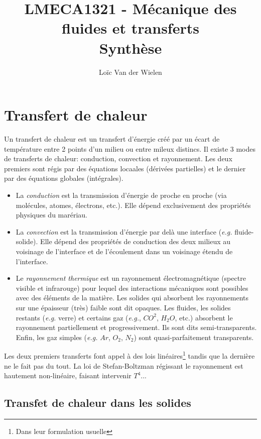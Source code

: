 \documentclass[a4paper,11pt]{report}
\title{LMECA1321 - Mécanique des fluides et transferts\\Synthèse}
\author{Loïc Van der Wielen}
\begin{document}
\maketitle
\tableofcontents




\chapter{Transfert de chaleur}
  Un transfert de chaleur est un transfert d'énergie créé par un écart de température entre 2 points d'un milieu ou entre mileux distincs. Il existe 3 modes de transferts de chaleur: conduction, convection et rayonnement. Les deux premiers sont régis par des équations locaales (dérivées partielles) et le dernier par des équations globales (intégrales).
  \begin{itemize}
    \item La \textit{conduction} est la transmission d'énergie de proche en proche (via molécules, atomes, électrons, etc.). Elle dépend exclusivement des propriétés physiques du marériau.
    \item La \textit{convection} est la transmission d'énergie par delà une interface (\textit{e.g.} fluide-solide). Elle dépend des propriétés de conduction des deux milieux au voisinage de l'interface et de l'écoulement dans un voisinage étendu de l'interface.
    \item Le \textit{rayonnement thermique} est un rayonnement électromagnétique (spectre visible et infrarouge) pour lequel des interactions mécaniques sont possibles avec des éléments de la matière. Les solides qui absorbent les rayonnements sur une épaisseur (très) faible sont dit opaques. Les fluides, les solides restants (\textit{e.g.} verre) et certains gaz (\textit{e.g.}, $CO^2$, $H_2O$, etc.) absorbent le rayonnement partiellement et progressivement. Ils sont dits semi-transparents. Enfin, les gaz simples (\textit{e.g.} $Ar$, $O_2$, $N_2$) sont quasi-parfaitement transparents.
  \end{itemize}

  Les deux premiers transferts font appel à des lois linéaires\footnote{Dans leur formulation usuelle} tandis que la dernière ne le fait pas du tout. La loi de Stefan-Boltzman régissant le rayonnement est hautement non-linéaire, faisant intervenir $T^4$...

  \section{Transfet de chaleur dans les solides}
\end{document}
